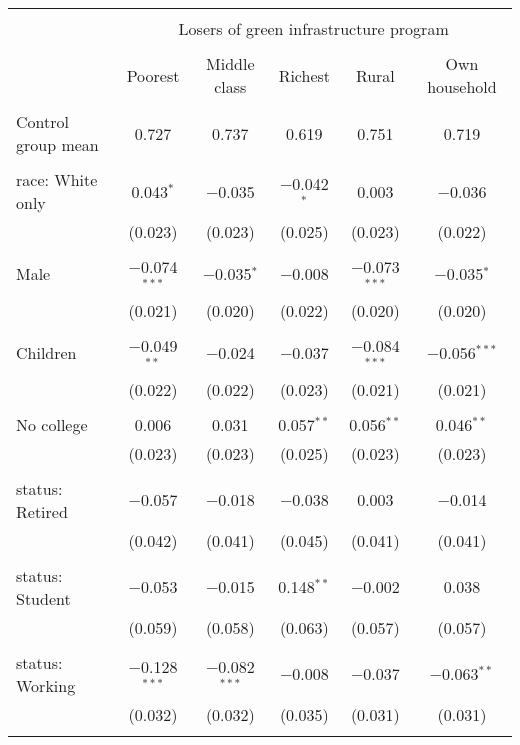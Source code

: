 
\begin{tabular}{@{\extracolsep{5pt}}lccccc} 
\\[-1.8ex]\hline 
\hline \\[-1.8ex] 
 & \multicolumn{5}{c}{Losers of green infrastructure program} \\ 
\cline{2-6} 
\\[-1.8ex] & Poorest & Middle class & Richest & Rural & Own household \\ 
\hline \\[-1.8ex] 
 Control group mean & 0.727 & 0.737 & 0.619 & 0.751 & 0.719  \\ \hline \\[-1.8ex] race: White only & 0.043$^{*}$ & $-$0.035 & $-$0.042$^{*}$ & 0.003 & $-$0.036 \\ 
  & (0.023) & (0.023) & (0.025) & (0.023) & (0.022) \\ 
  & & & & & \\ 
 Male & $-$0.074$^{***}$ & $-$0.035$^{*}$ & $-$0.008 & $-$0.073$^{***}$ & $-$0.035$^{*}$ \\ 
  & (0.021) & (0.020) & (0.022) & (0.020) & (0.020) \\ 
  & & & & & \\ 
 Children & $-$0.049$^{**}$ & $-$0.024 & $-$0.037 & $-$0.084$^{***}$ & $-$0.056$^{***}$ \\ 
  & (0.022) & (0.022) & (0.023) & (0.021) & (0.021) \\ 
  & & & & & \\ 
 No college & 0.006 & 0.031 & 0.057$^{**}$ & 0.056$^{**}$ & 0.046$^{**}$ \\ 
  & (0.023) & (0.023) & (0.025) & (0.023) & (0.023) \\ 
  & & & & & \\ 
 status: Retired & $-$0.057 & $-$0.018 & $-$0.038 & 0.003 & $-$0.014 \\ 
  & (0.042) & (0.041) & (0.045) & (0.041) & (0.041) \\ 
  & & & & & \\ 
 status: Student & $-$0.053 & $-$0.015 & 0.148$^{**}$ & $-$0.002 & 0.038 \\ 
  & (0.059) & (0.058) & (0.063) & (0.057) & (0.057) \\ 
  & & & & & \\ 
 status: Working & $-$0.128$^{***}$ & $-$0.082$^{***}$ & $-$0.008 & $-$0.037 & $-$0.063$^{**}$ \\ 
  & (0.032) & (0.032) & (0.035) & (0.031) & (0.031) \\ 
  & & & & & \\ 

\end{tabular}
